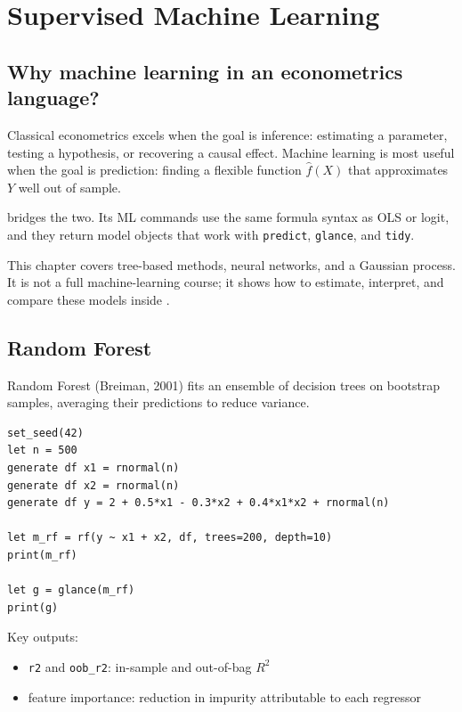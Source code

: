 \chapter{Supervised Machine Learning}

\section{Why machine learning in an econometrics language?}

Classical econometrics excels when the goal is inference: estimating a
parameter, testing a hypothesis, or recovering a causal effect. Machine
learning is most useful when the goal is prediction: finding a flexible
function $\hat f(X)$ that approximates $Y$ well out of sample.

\hayashi{} bridges the two. Its ML commands use the same formula syntax as
OLS or logit, and they return model objects that work with \texttt{predict},
\texttt{glance}, and \texttt{tidy}.

This chapter covers tree-based methods, neural networks, and a Gaussian
process. It is not a full machine-learning course; it shows how to
estimate, interpret, and compare these models inside \hayashi{}.

\section{Random Forest}

Random Forest (Breiman, 2001) fits an ensemble of decision trees on
bootstrap samples, averaging their predictions to reduce variance.

\begin{lstlisting}[caption={Random forest regression}]
set_seed(42)
let n = 500
generate df x1 = rnormal(n)
generate df x2 = rnormal(n)
generate df y = 2 + 0.5*x1 - 0.3*x2 + 0.4*x1*x2 + rnormal(n)

let m_rf = rf(y ~ x1 + x2, df, trees=200, depth=10)
print(m_rf)

let g = glance(m_rf)
print(g)
\end{lstlisting}

Key outputs:

\begin{itemize}
\item \texttt{r2} and \texttt{oob\_r2}: in-sample and out-of-bag $R^2$
\item feature importance: reduction in impurity attributable to each regressor
\end{itemize}

